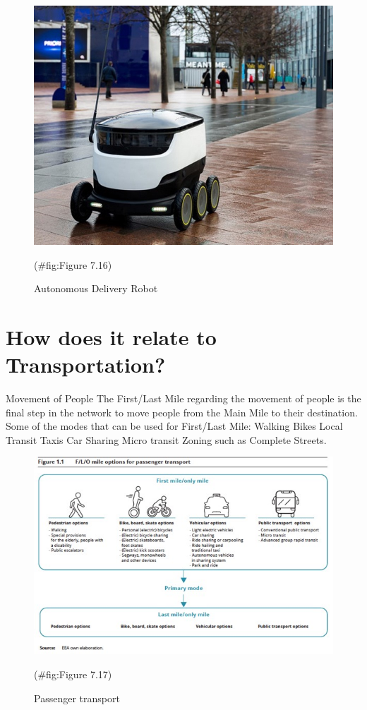 \documentclass[
]{book}
\begin{document}
\begin{figure}

{\centering \includegraphics{./Images/supplychain/Autonomous Delivery Robot} 

}

\caption{Autonomous Delivery Robot}(\#fig:Figure 7.16)
\end{figure}

\hypertarget{SupplyChain-whatisrelation}{%
\section{How does it relate to Transportation?}\label{SupplyChain-whatisrelation}}

Movement of People
The First/Last Mile regarding the movement of people is the final step in the network to move people from the Main Mile to their destination.
Some of the modes that can be used for First/Last Mile:
Walking
Bikes
Local Transit
Taxis
Car Sharing
Micro transit
Zoning such as Complete Streets.

\begin{figure}

{\centering \includegraphics{./Images/supplychain/Passenger transport} 

}

\caption{Passenger transport}(\#fig:Figure 7.17)
\end{figure}
\end{document}
